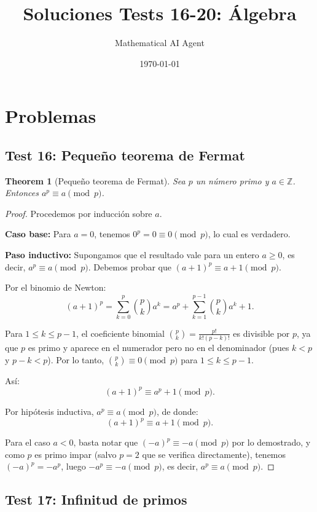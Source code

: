 \documentclass[11pt,a4paper]{article}
\title{Soluciones Tests 16-20: Álgebra}
\author{Mathematical AI Agent}
\date{\today}
\theoremstyle{plain}
\newtheorem{theorem}{Theorem}[section]
\theoremstyle{definition}
\begin{document}
\maketitle
\section{Problemas}

\subsection*{Test 16: Pequeño teorema de Fermat}

\begin{theorem}[Pequeño teorema de Fermat]
Sea $p$ un número primo y $a \in \mathbb{Z}$. Entonces $a^p \equiv a \pmod{p}$.
\end{theorem}

\begin{proof}
Procedemos por inducción sobre $a$.

\textbf{Caso base:} Para $a = 0$, tenemos $0^p = 0 \equiv 0 \pmod{p}$, lo cual es verdadero.

\textbf{Paso inductivo:} Supongamos que el resultado vale para un entero $a \geq 0$, es decir, $a^p \equiv a \pmod{p}$. Debemos probar que $(a+1)^p \equiv a+1 \pmod{p}$.

Por el binomio de Newton:
\[
(a+1)^p = \sum_{k=0}^{p} \binom{p}{k} a^k = a^p + \sum_{k=1}^{p-1} \binom{p}{k} a^k + 1.
\]

Para $1 \leq k \leq p-1$, el coeficiente binomial $\binom{p}{k} = \frac{p!}{k!(p-k)!}$ es divisible por $p$, ya que $p$ es primo y aparece en el numerador pero no en el denominador (pues $k < p$ y $p-k < p$). Por lo tanto, $\binom{p}{k} \equiv 0 \pmod{p}$ para $1 \leq k \leq p-1$.

Así:
\[
(a+1)^p \equiv a^p + 1 \pmod{p}.
\]

Por hipótesis inductiva, $a^p \equiv a \pmod{p}$, de donde:
\[
(a+1)^p \equiv a + 1 \pmod{p}.
\]

Para el caso $a < 0$, basta notar que $(-a)^p \equiv -a \pmod{p}$ por lo demostrado, y como $p$ es primo impar (salvo $p=2$ que se verifica directamente), tenemos $(-a)^p = -a^p$, luego $-a^p \equiv -a \pmod{p}$, es decir, $a^p \equiv a \pmod{p}$.
\end{proof}

\subsection*{Test 17: Infinitud de primos}
\end{document}
